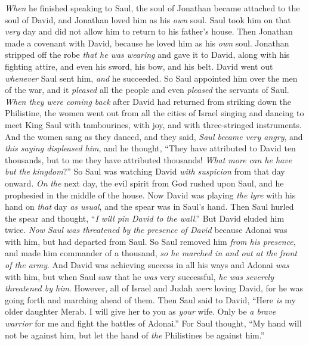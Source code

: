 \begin{biblechapter} %
 \textit{When} he finished speaking to Saul, the soul of Jonathan became attached to the soul of David, and Jonathan loved him as his \textit{own} soul.
\verse Saul took him on that \textit{very} day and did not allow him to return to his father’s house.
\verse Then Jonathan made a covenant with David, because he loved him as his \textit{own} soul.
\verse Jonathan stripped off the robe \textit{that he was wearing} and gave it to David, along with his fighting attire, and even his sword, his bow, and his belt.
 David went out \textit{whenever} Saul sent him, \textit{and} he succeeded. So Saul appointed him over the men of the war, and it \textit{pleased} all the people and even \textit{pleased} the servants of Saul.
\verse \textit{When they were coming back} after David had returned from striking down the Philistine, the women went out from all the cities of Israel singing and dancing to meet King Saul with tambourines, with joy, and with three-stringed instruments.
\verse And the women sang as they danced, and they said,
\verse \textit{Saul became very angry}, and \textit{this saying displeased him}, and he thought, “They have attributed to David ten thousands, but to me they have attributed thousands! \textit{What more can he have but the kingdom}?”
\verse So Saul was watching David \textit{with suspicion} from that day onward.
\verse \textit{On} \textit{the} next day, the evil spirit from God rushed upon Saul, and he prophesied in the middle of the house. Now David was playing \textit{the lyre} with his hand on \textit{that} day \textit{as usual}, and the spear was in Saul’s hand.
\verse Then Saul hurled the spear and thought, “\textit{I will pin David to the wall}.” But David eluded him twice.
\verse \textit{Now Saul was threatened by the presence of David} because Adonai was with him, but had departed from Saul.
\verse So Saul removed him \textit{from his presence}, and made him commander of a thousand, \textit{so he marched in and out at the front of the army}.
\verse And David was achieving success in all his ways and Adonai \textit{was} with him,
\verse but when Saul saw that he \textit{was} very successful, \textit{he was severely threatened by him}.
\verse However, all of Israel and Judah \textit{were} loving David, for he was going forth and marching ahead of them.
 Then Saul said to David, “Here \textit{is} my older daughter Merab. I will give her to you as \textit{your} wife. Only be \textit{a brave warrior} for me and fight the battles of Adonai.” For Saul thought, “My hand will not be against him, but let the hand of \textit{the} Philistines be against him.”

\end{biblechapter}
